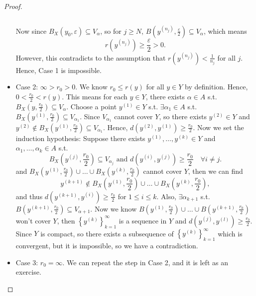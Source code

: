\begin{proof}
\begin{itemize}
\begin{explanation}
\[                \]   
            \end{explanation}
            Now since \(B_X(y_0, \varepsilon ) \subseteq V_\alpha \), so for \(j \ge N\), \(B\left( y^{(n_j)}, \frac{\varepsilon}{2} \right) \subseteq V_\alpha \), which means
            \[
                r\left( y^{(n_j)} \right) \ge \frac{\varepsilon}{2} > 0.
            \]    
            However, this contradicts to the assumption that \(r\left( y^{(n_j)} \right) < \frac{1}{n_j} \) for all \(j\).
            Hence, Case 1 is impossible. 
            \item Case 2: \( \infty > r_0 > 0\).   We know \(r_0 \le r(y)\) for all \(y \in Y\) by definition. Hence, \(0 < \frac{r_0}{2} < r(y)\). This means for each \(y \in Y\), there exists \(\alpha \in A\) s.t. \(B_X \left( y, \frac{r_0}{2} \right) \subseteq V_\alpha   \). Choose a point \(y^{(1)} \in Y\) s.t. \(\exists \alpha _1 \in A\) s.t. \(B_X \left( y^{(1)}, \frac{r_0}{2} \right) \subseteq V_{\alpha _1} \). Since \(V_{\alpha _1}\) cannot cover \(Y\), so there exists \(y^{(2)}\in Y\) and \(y^{(2)} \notin B_X \left( y^{(1)}, \frac{r_0}{2} \right) \subseteq V_{\alpha _1} \). Hence, \(d\left( y^{(2)}, y^{(1)} \right) \ge \frac{r_0}{2} \). Now we set the induction hypothesis: Suppose there exists \(y^{(1)}, \dots , y^{(k)} \in Y\) and \(\alpha _1, \dots , \alpha _k \in A\) s.t. 
            \[
                B_X \left( y^{(j)}, \frac{r_0}{2} \right) \subseteq V_{\alpha _j} \text{ and } d \left( y^{(i)}, y^{(j)} \right) \ge \frac{r_0}{2} \quad \forall i \neq j.  
            \] and \(B_X \left( y^{(1)}, \frac{r_0}{2} \right) \cup  \dots \cup B_X \left( y^{(k)}, \frac{r_0}{2} \right)  \) cannot cover \(Y\), then we can find
            \[
                y^{(k + 1)} \notin B_X \left( y^{(1)}, \frac{r_0}{2} \right) \cup  \dots \cup B_X \left( y^{(k)}, \frac{r_0}{2} \right), 
            \] and thus \(d\left( y^{(k+1)}, y^{(i)} \right) \ge \frac{r_0}{2} \) for \(1 \le i \le k\). Also, \(\exists \alpha _{k+1} \) s.t. \(B\left( y^{(k+1)}, \frac{r_0}{2} \right) \subseteq V_{\alpha + 1} \). Now we know \(B\left( y^{(1)}, \frac{r_0}{2} \right) \cup \dots \cup B\left( y^{(k+1)}, \frac{r_0}{2} \right)  \) won't cover \(Y\), then \(\left\{ y^{(k)} \right\}_{k=1}^{\infty}  \) is a sequence in \(Y\) and \(d\left( y^{(j)}, y^{(l)} \right) \ge \frac{r_0}{2} \). Since \(Y\) is compact, so there exists a subsequence of \(\left\{ y^{(k)} \right\}_{k=1}^{\infty}  \) which is convergent, but it is impossible, so we have a contradiction. 
            \item Case 3: \(r_0 = \infty \). We can repeat the step in Case 2, and it is left as an exercise.              
        \end{itemize}      
\end{proof}
